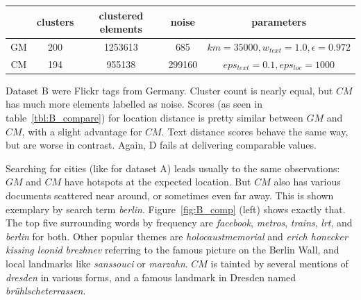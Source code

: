 %
\newpage
\begin{center}
\small
{}
\begin{tabular}{cSSSc}
\toprule
 & {clusters} &{clustered elements}&{noise}&{parameters}\\
\midrule
GM & 200 & 1253613 & 685&$km=35000, w_{text} = 1.0, \epsilon = 0.972$\\
CM & 194 & 955138 & 299160&$eps_{text} = 0.1, eps_{loc} = 1000$\\
\bottomrule
\end{tabular}
\end{center}
%
Dataset B were Flickr tags from Germany. Cluster count is nearly equal, but $CM$ has much more elements labelled as noise. Scores (as seen in table~\ref{tbl:B_compare}) for location distance is pretty similar between $GM$ and $CM$, with a slight advantage for $CM$. Text distance scores behave the same way, but are worse in contrast. Again, D fails at delivering comparable values.

Searching for cities (like for dataset A) leads usually to the same observations: $GM$ and $CM$ have hotspots at the expected location. But $CM$ also has various documents scattered near around, or sometimes even far away. This is shown exemplary by search term \emph{berlin}. Figure~\ref{fig:B_comp} (left) shows exactly that. The top five surrounding words by frequency are \emph{facebook}, \emph{metros}, \emph{trains}, \emph{lrt}, and \emph{berlin} for both. Other popular themes are \emph{holocaustmemorial} and \emph{erich honecker kissing leonid brezhnev} referring to the famous picture on the Berlin Wall, and local landmarks like \emph{sanssouci} or \emph{marzahn}. $CM$ is tainted by several mentions of \emph{dresden} in various forms, and a famous landmark in Dresden named \emph{brühlscheterrassen}.


